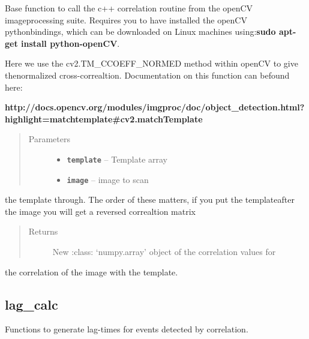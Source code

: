 \documentclass[a4paper,10pt,english]{sphinxmanual}
\begin{document}

\begin{fulllineitems}
\label{submodules/core.match_filter:match_filter.normxcorr2}
Base function to call the c++ correlation routine from the openCV imageprocessing suite.  Requires you to have installed the openCV pythonbindings, which can be downloaded on Linux machines using:\textbf{sudo apt-get install python-openCV}.

Here we use the cv2.TM\_CCOEFF\_NORMED method within openCV to give thenormalized cross-correaltion.  Documentation on this function can befound here:

\textbf{http://docs.opencv.org/modules/imgproc/doc/object\_detection.html?highlight=matchtemplate\#cv2.matchTemplate}
\begin{quote}\begin{description}
\item[{Parameters}] \leavevmode\begin{itemize}
\item {} 
\textbf{\texttt{template}} -- Template array

\item {} 
\textbf{\texttt{image}} -- image to scan

\end{itemize}

\end{description}\end{quote}

the template through.  The order of these matters, if you put the templateafter the image you will get a reversed correaltion matrix
\begin{quote}\begin{description}
\item[{Returns}] \leavevmode
New :class: `numpy.array' object of the correlation values for

\end{description}\end{quote}

the correlation of the image with the template.

\end{fulllineitems}



\subsection{lag\_calc}
\label{submodules/core.lag_calc:lag-calc}\label{submodules/core.lag_calc::doc}\label{submodules/core.lag_calc:module-lag_calc}
Functions to generate lag-times for events detected by correlation.
\end{document}
